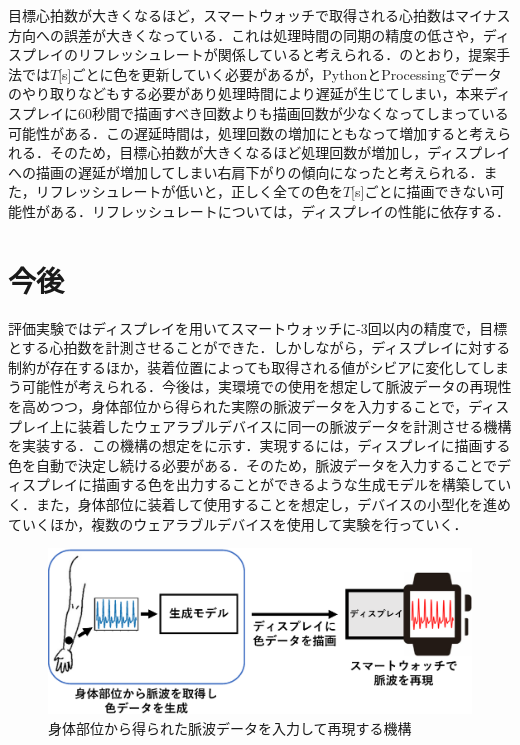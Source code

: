 \documentclass[Japanese,noauthor]{dicomopapers}
\begin{document}
目標心拍数が大きくなるほど，スマートウォッチで取得される心拍数はマイナス方向への誤差が大きくなっている．これは処理時間の同期の精度の低さや，ディスプレイのリフレッシュレートが関係していると考えられる．のとおり，提案手法では$T$[s]ごとに色を更新していく必要があるが，PythonとProcessingでデータのやり取りなどもする必要があり処理時間により遅延が生じてしまい，本来ディスプレイに60秒間で描画すべき回数よりも描画回数が少なくなってしまっている可能性がある．この遅延時間は，処理回数の増加にともなって増加すると考えられる．そのため，目標心拍数が大きくなるほど処理回数が増加し，ディスプレイへの描画の遅延が増加してしまい右肩下がりの傾向になったと考えられる．また，リフレッシュレートが低いと，正しく全ての色を$T$[s]ごとに描画できない可能性がある．リフレッシュレートについては，ディスプレイの性能に依存する．



\section{今後}
\label{sec:future_work}
評価実験ではディスプレイを用いてスマートウォッチに-3回以内の精度で，目標とする心拍数を計測させることができた．しかしながら，ディスプレイに対する制約が存在するほか，装着位置によっても取得される値がシビアに変化してしまう可能性が考えられる．今後は，実環境での使用を想定して脈波データの再現性を高めつつ，身体部位から得られた実際の脈波データを入力することで，ディスプレイ上に装着したウェアラブルデバイスに同一の脈波データを計測させる機構を実装する．この機構の想定をに示す．実現するには，ディスプレイに描画する色を自動で決定し続ける必要がある．そのため，脈波データを入力することでディスプレイに描画する色を出力することができるような生成モデルを構築していく．また，身体部位に装着して使用することを想定し，デバイスの小型化を進めていくほか，複数のウェアラブルデバイスを使用して実験を行っていく．

\begin{figure}[!t]
  \centering
  \includegraphics[width=1\linewidth]{figures/future_work.eps}
  \caption{身体部位から得られた脈波データを入力して再現する機構}
  \label{fig:future_work}
\end{figure}
\end{document}
